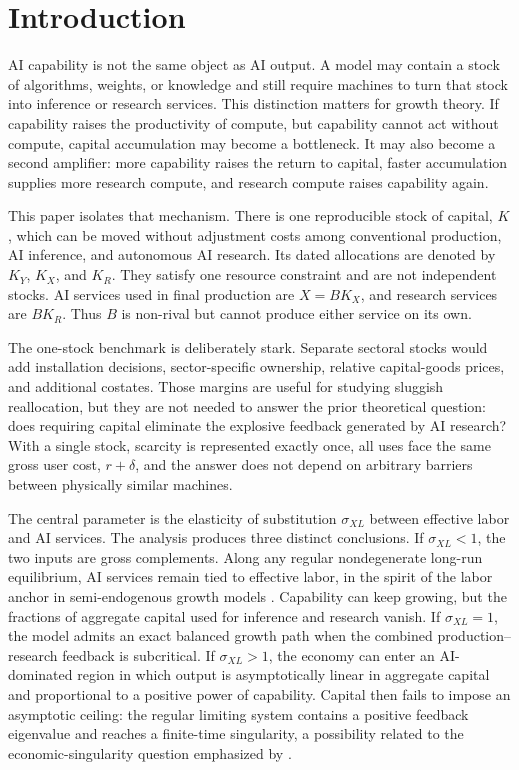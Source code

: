 \section{Introduction}
\label{sec:introduction}

AI capability is not the same object as AI output. A model may contain a stock of algorithms, weights, or knowledge and still require machines to turn that stock into inference or research services. This distinction matters for growth theory. If capability raises the productivity of compute, but capability cannot act without compute, capital accumulation may become a bottleneck. It may also become a second amplifier: more capability raises the return to capital, faster accumulation supplies more research compute, and research compute raises capability again.

This paper isolates that mechanism. There is one reproducible stock of capital, $K$, which can be moved without adjustment costs among conventional production, AI inference, and autonomous AI research. Its dated allocations are denoted by $K_Y$, $K_X$, and $K_R$. They satisfy one resource constraint and are not independent stocks. AI services used in final production are $X=BK_X$, and research services are $BK_R$. Thus $B$ is non-rival but cannot produce either service on its own.

The one-stock benchmark is deliberately stark. Separate sectoral stocks would add installation decisions, sector-specific ownership, relative capital-goods prices, and additional costates. Those margins are useful for studying sluggish reallocation, but they are not needed to answer the prior theoretical question: does requiring capital eliminate the explosive feedback generated by AI research? With a single stock, scarcity is represented exactly once, all uses face the same gross user cost, $r+\delta$, and the answer does not depend on arbitrary barriers between physically similar machines.

The central parameter is the elasticity of substitution $\sigma_{XL}$ between effective labor and AI services. The analysis produces three distinct conclusions. If $\sigma_{XL}<1$, the two inputs are gross complements. Along any regular nondegenerate long-run equilibrium, AI services remain tied to effective labor, in the spirit of the labor anchor in semi-endogenous growth models \citep{Jones1995}. Capability can keep growing, but the fractions of aggregate capital used for inference and research vanish. If $\sigma_{XL}=1$, the model admits an exact balanced growth path when the combined production--research feedback is subcritical. If $\sigma_{XL}>1$, the economy can enter an AI-dominated region in which output is asymptotically linear in aggregate capital and proportional to a positive power of capability. Capital then fails to impose an asymptotic ceiling: the regular limiting system contains a positive feedback eigenvalue and reaches a finite-time singularity, a possibility related to the economic-singularity question emphasized by \citet{Nordhaus2021}.

